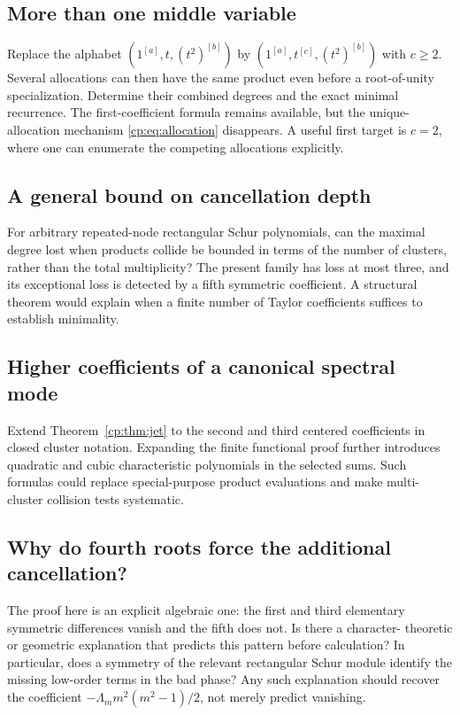 \documentclass[11pt]{article}
\theoremstyle{definition}
\theoremstyle{remark}
\theoremstyle{definition}
\theoremstyle{plain}
\numberwithin{equation}{section}
\begin{document}
\subsection{More than one middle variable}
\label{cp:q:middle}
Replace the alphabet $(1^{[a]},t,(t^2)^{[b]})$ by
$(1^{[a]},t^{[c]},(t^2)^{[b]})$ with $c\ge2$.
Several allocations can then have the same product even before a
root-of-unity specialization. Determine their combined degrees and the
exact minimal recurrence. The first-coefficient formula remains available,
but the unique-allocation mechanism \eqref{cp:eq:allocation} disappears.
A useful first target is $c=2$, where one can enumerate the competing
allocations explicitly.

\subsection{A general bound on cancellation depth}
\label{cp:q:depth}
For arbitrary repeated-node rectangular Schur polynomials, can the maximal
degree lost when products collide be bounded in terms of the number of
clusters, rather than the total multiplicity? The present family has loss
at most three, and its exceptional loss is detected by a fifth symmetric
coefficient. A structural theorem would explain when a finite number of
Taylor coefficients suffices to establish minimality.

\subsection{Higher coefficients of a canonical spectral mode}
\label{cp:q:higher}
Extend Theorem~\ref{cp:thm:jet} to the second and third centered coefficients
in closed cluster notation. Expanding the finite functional proof further
introduces quadratic and cubic characteristic polynomials in the selected
sums. Such formulas could replace special-purpose product evaluations and
make multi-cluster collision tests systematic.

\subsection{Why do fourth roots force the additional cancellation?}
\label{cp:q:fourth}
The proof here is an explicit algebraic one: the first and third elementary
symmetric differences vanish and the fifth does not. Is there a character-
theoretic or geometric explanation that predicts this pattern before
calculation? In particular, does a symmetry of the relevant rectangular
Schur module identify the missing low-order terms in the bad phase?
Any such explanation should recover the coefficient
$-\Lambda_m m^2(m^2-1)/2$, not merely predict vanishing.
\end{document}
